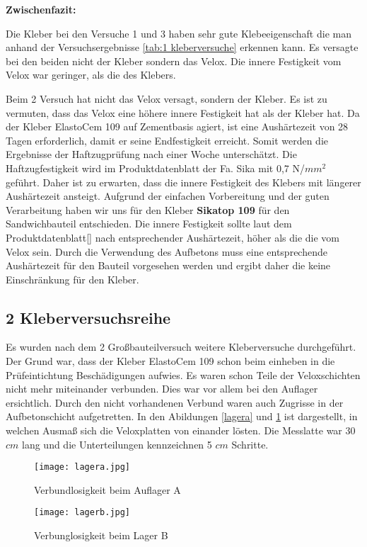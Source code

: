 \documentclass[12 pt,a4 paper ]{scrreprt}
\begin{document}
\textbf{Zwischenfazit:}
\newline

Die Kleber bei den Versuche 1 und 3 haben sehr gute Klebeeigenschaft die man anhand der Versuchsergebnisse \ref{tab:1 kleberversuche} erkennen kann. Es versagte bei den beiden nicht der Kleber sondern das Velox. Die innere Festigkeit vom Velox war geringer, als die des Klebers. 

Beim 2 Versuch hat nicht das Velox versagt, sondern der Kleber. Es ist zu vermuten, dass das Velox eine höhere innere Festigkeit hat als der Kleber hat. Da der Kleber ElastoCem 109 auf Zementbasis agiert, ist eine Aushärtezeit von 28 Tagen erforderlich, damit er seine Endfestigkeit erreicht.  Somit werden die Ergebnisse der Haftzugprüfung nach einer Woche unterschätzt.  Die Haftzugfestigkeit wird im Produktdatenblatt der Fa. Sika mit 0,7 N/$mm^{2}$ geführt. Daher ist zu erwarten, dass die innere Festigkeit des Klebers mit längerer Aushärtezeit ansteigt.
Aufgrund der einfachen Vorbereitung und der guten Verarbeitung haben wir uns für den Kleber \textbf{Sikatop 109} für den Sandwichbauteil entschieden. Die innere Festigkeit sollte laut dem Produktdatenblatt[] nach entsprechender Aushärtezeit, höher als die die vom Velox sein. Durch die Verwendung des Aufbetons muss eine entsprechende Aushärtezeit für den Bauteil vorgesehen werden und ergibt daher die keine Einschränkung für den Kleber. 



\subsection{2 Kleberversuchsreihe}

Es wurden nach dem 2 Großbauteilversuch weitere Kleberversuche durchgeführt. Der Grund war, dass der Kleber ElastoCem 109 schon beim einheben in die Prüfeintichtung Beschädigungen aufwies. Es waren schon Teile der Veloxschichten nicht mehr miteinander verbunden. Dies war vor allem bei den Auflager ersichtlich. Durch den nicht vorhandenen Verbund waren auch Zugrisse in der Aufbetonschicht aufgetretten. In den Abildungen \ref{lagera} und \ref{lagerb} ist dargestellt, in welchen Ausmaß sich die Veloxplatten von einander lösten. Die Messlatte war 30 $ cm $ lang und die Unterteilungen kennzeichnen 5 $ cm $ Schritte.  

\begin{figure} [h]
\begin{minipage}[hbt]{7cm}	
	\texttt{[image: lagera.jpg]}
	\caption{Verbundlosigkeit beim Auflager A}
	\label{lagera}
\end{minipage}
\hfill
\begin{minipage}[hbt]{7cm}
	\texttt{[image: lagerb.jpg]}
	\caption{Verbunglosigkeit beim Lager B}
	\label{lagerb}
\end{minipage}
\end{figure}
\end{document}
